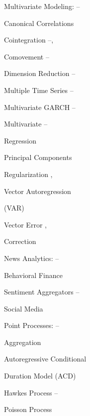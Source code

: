 \begin{multicols}{2}
\noindent Multivariate Modeling: \hfill \pageref{in:multimod1}--\pageref{in:multimod2} \par
\twoindent Canonical Correlations \hfill \pageref{in:cancor1} \par %
\twoindent Cointegration \hfill \pageref{in:coint1}--\pageref{in:coint2}, \pageref{in:coint3} \par
\twoindent Comovement \hfill \pageref{in:comove1}--\pageref{in:comove2} \par
\twoindent Dimension Reduction \hfill \pageref{in:dimred1}--\pageref{in:dimred2} \par
\twoindent Multiple Time Series \hfill \pageref{in:mts1}--\pageref{in:mts2} \par
\twoindent Multivariate GARCH \hfill \pageref{in:multgarch1}--\pageref{in:multgarch2} \par
\twoindent Multivariate \hfill \pageref{in:multreg1}--\pageref{in:multreg2} \par \hspace{0.75cm} Regression \par 
\twoindent Principal Components \hfill \pageref{in:pca} \par
\twoindent Regularization \hfill \pageref{in:regz1}, \pageref{in:regz2} \par
\twoindent Vector Autoregression \hfill \pageref{in:var} \par \hspace{0.75cm} (VAR) \par 
\twoindent Vector Error \hfill \pageref{in:vec1}, \pageref{in:vec2} \par \hspace{0.75cm} Correction \par 
\vspace{\baselineskip}


\noindent News Analytics: \hfill \pageref{in:newsan1}--\pageref{in:newsan2} \par
\twoindent Behavioral Finance \hfill \pageref{in:behave1} \par
\twoindent Sentiment Aggregators \hfill \pageref{in:sentag1}--\pageref{in:sentag2} \par
\twoindent Social Media \hfill \pageref{in:social} \par
\vspace{\baselineskip}


\noindent Point Processes: \hfill \pageref{in:point1}--\pageref{in:point2} \par
\twoindent Aggregation \hfill \pageref{in:agg} \par
\twoindent Autoregressive Conditional \hfill \pageref{in:acd} \par \hspace{0.75cm} Duration Model (ACD) \par 
\twoindent Hawkes Process \hfill \pageref{in:hawk1}--\pageref{in:hawk2} \par
\twoindent Poisson Process \hfill \pageref{in:poisson} \par
\vspace{\baselineskip}



\end{multicols}
